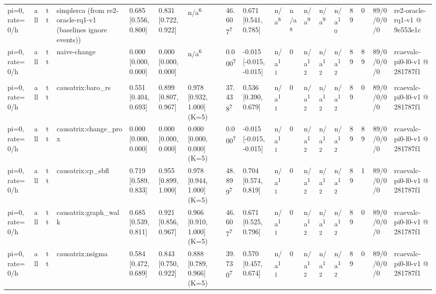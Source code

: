 \begin{table}[t]
\begin{tabular}{llllllllllllllllll}
pi=0, rate=0/h & all & tt & simplerca (from re2-oracle-rq1-v1 (baselines ignore events)) & 0.685 [0.556, 0.800] & 0.831 [0.722, 0.922] & n/a\textsuperscript{6} & 46.607\textsuperscript{7} & 0.671 [0.541, 0.785] & n/a\textsuperscript{8} & n/a\textsuperscript{8} & n/a\textsuperscript{9} & n/a\textsuperscript{9} & n/a\textsuperscript{10} & 89 & 0 & 89/0/0/0/0 & re2-oracle-rq1-v1 @ 9e553e1c \\
pi=0, rate=0/h & all & tt & naive-change & 0.000 [0.000, 0.000] & 0.000 [0.000, 0.000] & n/a\textsuperscript{6} & 0.000\textsuperscript{7} & -0.015 [-0.015, -0.015] & n/a\textsuperscript{11} & 0 & n/a\textsuperscript{12} & n/a\textsuperscript{12} & n/a\textsuperscript{12} & 89 & 89 & 89/0/0/0/0 & rcaevalc-pi0-l0-v1 @ 281787f1 \\
pi=0, rate=0/h & all & tt & causatrix:baro\_rs & 0.551 [0.404, 0.693] & 0.899 [0.807, 0.967] & 0.978 [0.932, 1.000] (K=5) & 37.438\textsuperscript{7} & 0.536 [0.390, 0.679] & n/a\textsuperscript{11} & 0 & n/a\textsuperscript{12} & n/a\textsuperscript{12} & n/a\textsuperscript{12} & 89 & 0 & 89/0/0/0/0 & rcaevalc-pi0-l0-v1 @ 281787f1 \\
pi=0, rate=0/h & all & tt & causatrix:change\_prox & 0.000 [0.000, 0.000] & 0.000 [0.000, 0.000] & 0.000 [0.000, 0.000] (K=5) & 0.000\textsuperscript{7} & -0.015 [-0.015, -0.015] & n/a\textsuperscript{11} & 0 & n/a\textsuperscript{12} & n/a\textsuperscript{12} & n/a\textsuperscript{12} & 89 & 89 & 89/0/0/0/0 & rcaevalc-pi0-l0-v1 @ 281787f1 \\
pi=0, rate=0/h & all & tt & causatrix:cp\_sbfl & 0.719 [0.589, 0.833] & 0.955 [0.899, 1.000] & 0.978 [0.944, 1.000] (K=5) & 48.899\textsuperscript{7} & 0.704 [0.574, 0.819] & n/a\textsuperscript{11} & 0 & n/a\textsuperscript{12} & n/a\textsuperscript{12} & n/a\textsuperscript{12} & 89 & 1 & 89/0/0/0/0 & rcaevalc-pi0-l0-v1 @ 281787f1 \\
pi=0, rate=0/h & all & tt & causatrix:graph\_walk & 0.685 [0.539, 0.811] & 0.921 [0.856, 0.967] & 0.966 [0.910, 1.000] (K=5) & 46.607\textsuperscript{7} & 0.671 [0.525, 0.796] & n/a\textsuperscript{11} & 0 & n/a\textsuperscript{12} & n/a\textsuperscript{12} & n/a\textsuperscript{12} & 89 & 0 & 89/0/0/0/0 & rcaevalc-pi0-l0-v1 @ 281787f1 \\
pi=0, rate=0/h & all & tt & causatrix:nsigma & 0.584 [0.472, 0.689] & 0.843 [0.750, 0.922] & 0.888 [0.789, 0.966] (K=5) & 39.730\textsuperscript{7} & 0.570 [0.457, 0.674] & n/a\textsuperscript{11} & 0 & n/a\textsuperscript{12} & n/a\textsuperscript{12} & n/a\textsuperscript{12} & 89 & 0 & 89/0/0/0/0 & rcaevalc-pi0-l0-v1 @ 281787f1 \\

\end{tabular}
\end{table}
